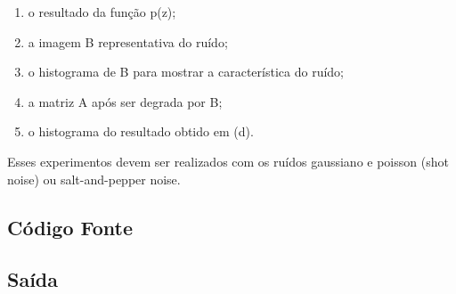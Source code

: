 \documentclass[10pt,a4paper]{article}
\begin{document}
\begin{enumerate}[label=\alph*.]
   \item o resultado da função p(z);
   \item a imagem B representativa do ruído;
   \item o histograma de B para mostrar a característica do ruído;
   \item a matriz A após ser degrada por B;
   \item o histograma do resultado obtido em (d).
\end{enumerate}

 Esses experimentos devem ser realizados com os ruídos gaussiano e poisson (shot noise) ou salt-and-pepper noise.

\subsection{Código Fonte}



\subsection{Saída}



\begin{figure}[H]
    \centering
    \qquad
    \qquad
    \centering
    \qquad
    \qquad
\end{figure}
\end{document}
